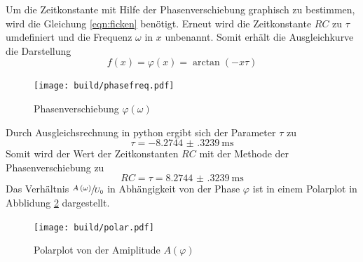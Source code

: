 Um die Zeitkonstante mit Hilfe der Phasenverschiebung graphisch zu bestimmen, wird die Gleichung \eqref{eqn:ficken} benötigt.
Erneut wird die Zeitkonstante $RC$ zu $\tau$ umdefiniert und die Frequenz $\omega$ in $x$ unbenannt.
Somit erhält die Ausgleichkurve die Darstellung 
\begin{equation}
    f \left( x \right) = \varphi \left ( x \right ) = \arctan \left( - x \tau \right)
\end{equation}
\begin{figure}
    \centering
    \caption{Phasenverschiebung $\varphi \left ( \omega \right )$}
    \label{fig:phiw}
    \texttt{[image: build/phasefreq.pdf]}
\end{figure}
Durch Ausgleichsrechnung in python ergibt sich der Parameter $\tau$ zu 
\begin{equation*}
    \tau = \SI{-8.2744(3239)}{\milli\second}
\end{equation*}
Somit wird der Wert der Zeitkonstanten $RC$ mit der Methode der Phasenverschiebung zu
\begin{equation*}
    RC =     \tau = \SI{8.2744(3239)}{\milli\second}
\end{equation*}
Das Verhältnis $\sfrac{A \left ( \omega \right )}{U_0}$ in Abhängigkeit von der Phase $\varphi$ ist in einem Polarplot in Abblidung \ref{fig:polar} dargestellt.
\begin{figure}
    \centering
    \caption{Polarplot von der Amiplitude $A \left( \varphi \right)$}
    \label{fig:polar}
    \texttt{[image: build/polar.pdf]}
\end{figure}